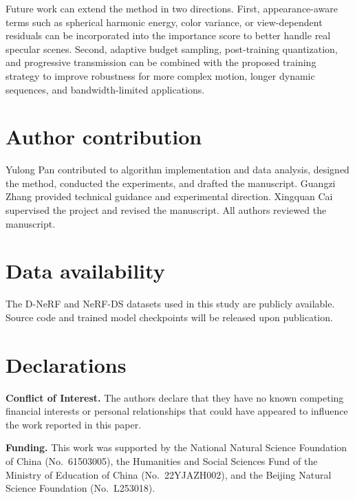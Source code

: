 \documentclass[pdflatex,sn-mathphys]{sn-jnl}
\begin{document}
Future work can extend the method in two directions. First, appearance-aware terms such as spherical harmonic energy, color variance, or view-dependent residuals can be incorporated into the importance score to better handle real specular scenes. Second, adaptive budget sampling, post-training quantization, and progressive transmission can be combined with the proposed training strategy to improve robustness for more complex motion, longer dynamic sequences, and bandwidth-limited applications.


\section*{Author contribution}
Yulong Pan contributed to algorithm implementation and data analysis, designed the method, conducted the experiments, and drafted the manuscript. Guangzi Zhang provided technical guidance and experimental direction. Xingquan Cai supervised the project and revised the manuscript. All authors reviewed the manuscript.

\section*{Data availability}
The D-NeRF and NeRF-DS datasets used in this study are publicly available. Source code and trained model checkpoints will be released upon publication.

\section*{Declarations}

\noindent\textbf{Conflict of Interest.} The authors declare that they have no known competing financial interests or personal relationships that could have appeared to influence the work reported in this paper.

\noindent\textbf{Funding.} This work was supported by the National Natural Science Foundation of China (No.~61503005), the Humanities and Social Sciences Fund of the Ministry of Education of China (No.~22YJAZH002), and the Beijing Natural Science Foundation (No.~L253018).
\end{document}
